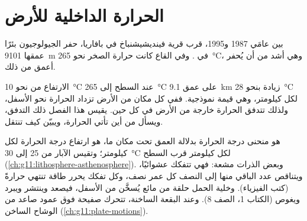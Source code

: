 \chapter{الحرارة الداخلية للأرض}\label{ch:g12:internal-heat}

بين عامَي 1987 و1995، قرب قرية فينديشيشنباخ في بافاريا، حفر
الجيولوجيون بئرًا عمقها \qty{9101}{m} في . وفي
القاع كانت حرارة الصخر نحو \qty{265}{\celsius}، وهي أشد من أن يُحفر
أعمق من ذلك.

الارتفاع من نحو \qty{10}{\celsius} عند السطح إلى \qty{265}{\celsius} على عمق
\qty{9.1}{km} زيادة بنحو \qty{28}{\celsius} لكل كيلومتر، وهي قيمة
نموذجية. ففي كل مكان من الأرض تزداد الحرارة نحو الأسفل، ولذلك تتدفق الحرارة خارجة من
الأرض في كل حين. يقيس هذا الفصل ذلك التدفق، ويسأل من أين تأتي الحرارة،
ويبيّن كيف تنتقل.

\begin{recall}
 هو منحنى درجة الحرارة بدلالة العمق تحت مكان ما،
 هو ارتفاع درجة الحرارة لكل كيلومتر؛ وتقيس الآبار
من 25 إلى \qty{30}{\celsius} لكل كيلومتر قرب السطح
(\cref{ch:g11:lithosphere-asthenosphere}). وبعض الذرات مشعة: فهي
تتفكك عشوائيًا، ويتناقص عدد الباقي منها إلى النصف كل عمر نصف، وكل
تفكك يحرر طاقة تنتهي حرارةً (كتب الفيزياء). وخلية
الحمل حلقة من مائع يُسخَّن من الأسفل، فيصعد وينتشر
ويبرد ويغوص (الكتاب 1، الصف 8). وعند البقعة الساخنة، تتحرك صفيحة فوق عمود صاعد
من الوشاح الساخن (\cref{ch:g11:plate-motions}).
\end{recall}

